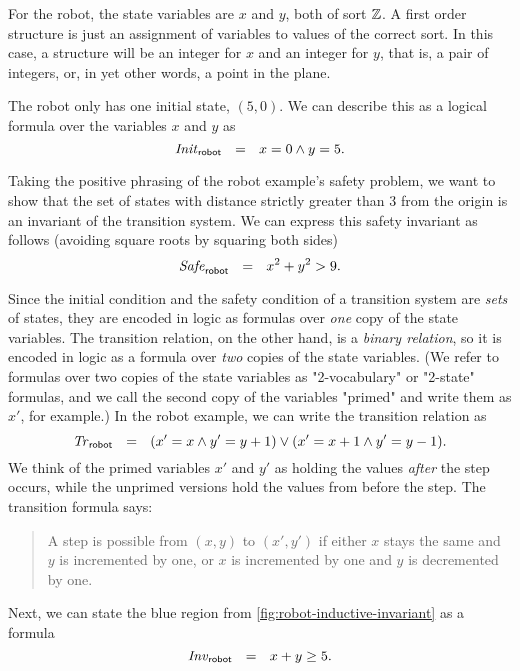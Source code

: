 For the robot, the state variables are $x$ and $y$,
  both of sort $\mathbb{Z}$.
A first order structure is just
  an assignment of variables to values of the correct sort.
In this case, a structure will be an integer for $x$ and an integer for $y$,
  that is, a pair of integers, or, in yet other words, a point in the plane.

The robot only has one initial state, $(5, 0)$.
We can describe this as a logical formula over the variables $x$ and $y$ as
\[
  \mathit{Init}_{\mathsf{robot}} ~~=~~ x = 0 \land y = 5.
\]

Taking the positive phrasing of the robot example's safety problem,
  we want to show that the set of states
  with distance strictly greater than 3 from the origin
  is an invariant of the transition system.
We can express this safety invariant as follows
  (avoiding square roots by squaring both sides)
\[
  \mathit{Safe}_{\mathsf{robot}} ~~=~~ x^2 + y^2 > 9.
\]

Since the initial condition and the safety condition
  of a transition system are \emph{sets} of states,
  they are encoded in logic as formulas over \emph{one} copy of the state variables.
The transition relation, on the other hand, is a \emph{binary relation},
  so it is encoded in logic as a formula over \emph{two} copies of the state variables.
(We refer to formulas over two copies of the state variables as
  "2-vocabulary" or "2-state" formulas,
  and we call the second copy of the variables "primed"
  and write them as $x'$, for example.)
In the robot example, we can write the transition relation as
\[
    \mathit{Tr}_{\mathsf{robot}} ~~=~~ (x' = x \land y' = y + 1) \lor (x' = x + 1 \land y' = y - 1).
\]
We think of the primed variables $x'$ and $y'$ as
  holding the values \emph{after} the step occurs,
while the unprimed versions hold the values from before the step.
The transition formula says:
\begin{quote}
  A step is possible from $(x, y)$ to $(x', y')$ if
    either $x$ stays the same and $y$ is incremented by one,
    or $x$ is incremented by one and $y$ is decremented by one.
\end{quote}

Next, we can state the blue region from \cref{fig:robot-inductive-invariant}
  as a formula
\[
  \mathit{Inv}_{\mathsf{robot}} ~~=~~ x + y \ge 5.
\]

